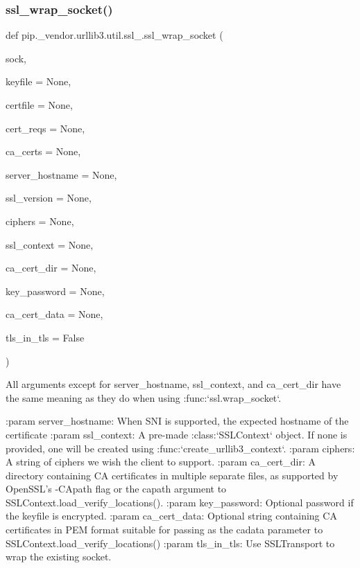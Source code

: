 \subsubsection{\texorpdfstring{ssl\+\_\+wrap\+\_\+socket()}{ssl\_wrap\_socket()}}
{\footnotesize\ttfamily def pip.\+\_\+vendor.\+urllib3.\+util.\+ssl\+\_\+.\+ssl\+\_\+wrap\+\_\+socket (\begin{DoxyParamCaption}\item[{}]{sock,  }\item[{}]{keyfile = {\ttfamily None},  }\item[{}]{certfile = {\ttfamily None},  }\item[{}]{cert\+\_\+reqs = {\ttfamily None},  }\item[{}]{ca\+\_\+certs = {\ttfamily None},  }\item[{}]{server\+\_\+hostname = {\ttfamily None},  }\item[{}]{ssl\+\_\+version = {\ttfamily None},  }\item[{}]{ciphers = {\ttfamily None},  }\item[{}]{ssl\+\_\+context = {\ttfamily None},  }\item[{}]{ca\+\_\+cert\+\_\+dir = {\ttfamily None},  }\item[{}]{key\+\_\+password = {\ttfamily None},  }\item[{}]{ca\+\_\+cert\+\_\+data = {\ttfamily None},  }\item[{}]{tls\+\_\+in\+\_\+tls = {\ttfamily False} }\end{DoxyParamCaption})}

\begin{DoxyVerb}All arguments except for server_hostname, ssl_context, and ca_cert_dir have
the same meaning as they do when using :func:`ssl.wrap_socket`.

:param server_hostname:
    When SNI is supported, the expected hostname of the certificate
:param ssl_context:
    A pre-made :class:`SSLContext` object. If none is provided, one will
    be created using :func:`create_urllib3_context`.
:param ciphers:
    A string of ciphers we wish the client to support.
:param ca_cert_dir:
    A directory containing CA certificates in multiple separate files, as
    supported by OpenSSL's -CApath flag or the capath argument to
    SSLContext.load_verify_locations().
:param key_password:
    Optional password if the keyfile is encrypted.
:param ca_cert_data:
    Optional string containing CA certificates in PEM format suitable for
    passing as the cadata parameter to SSLContext.load_verify_locations()
:param tls_in_tls:
    Use SSLTransport to wrap the existing socket.
\end{DoxyVerb}
 \mbox{\label{namespacepip_1_1__vendor_1_1urllib3_1_1util_1_1ssl___a22e7b3b7a3b808fcad53f05a05580f79}} 
